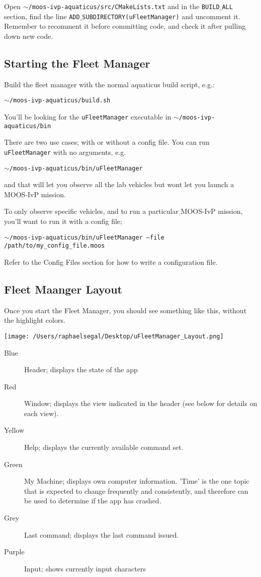\documentclass[11pt]{article}
\newcommand{\cmdline}[1]{\vspace{.2em} $\:$\\ \begin{minipage}{\dimexpr\textwidth-2cm}
\texttt{#1}
\end{minipage} $\:$\\ \vspace{-.2em} }
\begin{document}
Open \texttt{$\sim$/moos-ivp-aquaticus/src/CMakeLists.txt} and in the \texttt{BUILD$\_$ALL} section, find the line \texttt{ADD$\_$SUBDIRECTORY(uFleetManager)} and uncomment it. Remember to recomment it before committing code, and check it after pulling down new code.
\subsection{Starting the Fleet Manager}
Build the fleet manager with the normal aquaticus build script, e.g.:
\cmdline{$\sim$/moos-ivp-aquaticus/build.sh}
You'll be looking for the \texttt{uFleetManager} executable in \texttt{$\sim$/moos-ivp-aquaticus/bin} 

There are two use cases; with or without a config file. You can run \texttt{uFleetManager} with no arguments, e.g.
\cmdline{$\sim$/moos-ivp-aquaticus/bin/uFleetManager}
and that will let you observe all the lab vehicles but wont let you launch a MOOS-IvP mission.

To only observe specific vehicles, and to run a particular MOOS-IvP mission, you'll want to run it with a config file;
\cmdline{$\sim$/moos-ivp-aquaticus/bin/uFleetManager --file /path/to/my\_config\_file.moos}
Refer to the Config Files section for how to write a configuration file.

\subsection{Fleet Maanger Layout}
Once you start the Fleet Manager, you should see something like this, without the highlight colors.

\texttt{[image: /Users/raphaelsegal/Desktop/uFleetManager\_Layout.png]}
\begin{description}
\item[Blue] Header; displays the state of the app
\item[Red] Window; displays the view indicated in the header (see below for details on each view).
\item[Yellow] Help; displays the currently available command set.
\item[Green] My Machine; displays own computer information. 'Time' is the one topic that is expected to change frequently and consistently, and therefore can be used to determine if the app has crashed.
\item[Grey] Last command; displays the last command issued. 
\item[Purple] Input; shows currently input characters
\end{description}
\end{document}

